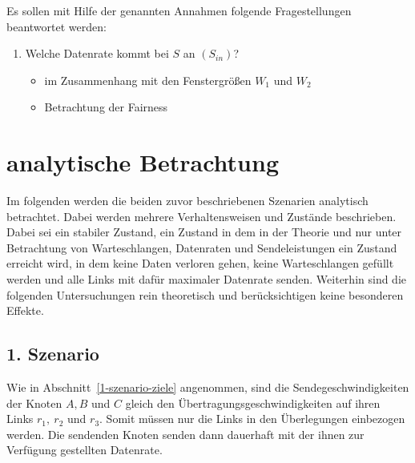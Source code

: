 \documentclass [10pt,a4paper]{article}
\begin{document}
		Es sollen mit Hilfe der genannten Annahmen folgende Fragestellungen beantwortet werden:
		\begin{enumerate}
			\item Welche Datenrate kommt bei $S$ an $(S_{in})$?
			\begin{itemize}
				\item im Zusammenhang mit den Fenstergrößen $W_1$ und $W_2$
				\item Betrachtung der Fairness
			\end{itemize}
		\end{enumerate}

\section{analytische Betrachtung}
	Im folgenden werden die beiden zuvor beschriebenen Szenarien analytisch betrachtet. Dabei werden mehrere Verhaltensweisen und Zustände beschrieben. Dabei sei ein \glqq stabiler Zustand\grqq{}, ein Zustand in dem in der Theorie und nur unter Betrachtung von Warteschlangen, Datenraten und Sendeleistungen ein Zustand erreicht wird, in dem keine Daten verloren gehen, keine Warteschlangen gefüllt werden und alle Links mit dafür maximaler Datenrate senden. Weiterhin sind die folgenden Untersuchungen rein theoretisch und berücksichtigen keine besonderen Effekte.
	\subsection{1. Szenario}
		Wie in Abschnitt~\ref{1-szenario-ziele} angenommen, sind die Sendegeschwindigkeiten der Knoten $A,B$ und $C$ gleich den Übertragungsgeschwindigkeiten auf ihren Links $r_1,\ r_2$ und $r_3$. Somit müssen nur die Links in den Überlegungen einbezogen werden. Die sendenden Knoten senden dann dauerhaft mit der ihnen zur Verfügung gestellten Datenrate.
		
\end{document}

